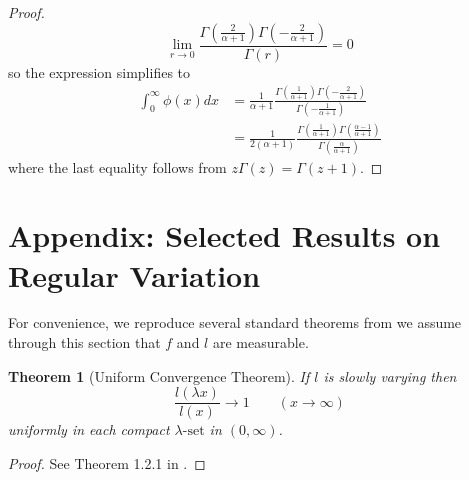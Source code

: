 \documentclass[10pt]{article}
\theoremstyle{plain}
\newtheorem{theorem}{Theorem}
\theoremstyle{definition}
\begin{document}
\begin{proof}
		\begin{equation}
			\lim_{r\to 0}\frac{\Gamma(\frac{2}{\alpha+1})\Gamma(-\frac{2}{\alpha+1})}{\Gamma(r)}=0
		\end{equation}
		so the expression simplifies to
		\begin{align}
			\int_{0}^{\infty} \phi(x)dx&=\frac{1}{\alpha+1}
			\frac{\Gamma(\frac{1}{\alpha+1})\Gamma(-\frac{2}{\alpha+1})}{\Gamma(-\frac{1}{\alpha+1})}
			\\
			&=\frac{1}{2(\alpha+1)}
			\frac{\Gamma(\frac{1}{\alpha+1})\Gamma(\frac{\alpha-1}{\alpha+1})}{\Gamma(\frac{\alpha}{\alpha+1})}
		\end{align}
		where the last equality follows from $z\Gamma(z)=\Gamma(z+1)$.
	\end{proof}
	
	
	
	
	
	
	
	
	
	
	
	
	
	
	
	
	
	
	
	
	
	\setcounter{theorem}{0}
	\setcounter{lemma}{0}
	\setcounter{proposition}{0}
	\setcounter{definition}{0}
	\section{Appendix: Selected Results on Regular Variation}
	
	For convenience, we reproduce several standard theorems from
	\cite{bingham1987regular} we assume through this section that $f$ and $l$ are measurable.
	
	\begin{theorem}[Uniform Convergence Theorem]\label{UCT}
		If $l$ is slowly varying then
		\[
		\frac{l(\lambda x)}{l(x)}\to 1\qquad (x\to \infty)
		\]
		uniformly in each compact $\lambda\text{-set}$ in $(0, \infty)$.
	\end{theorem}
	\begin{proof}
		See Theorem 1.2.1 in \cite{bingham1987regular}.
	\end{proof}
	
\end{document}
